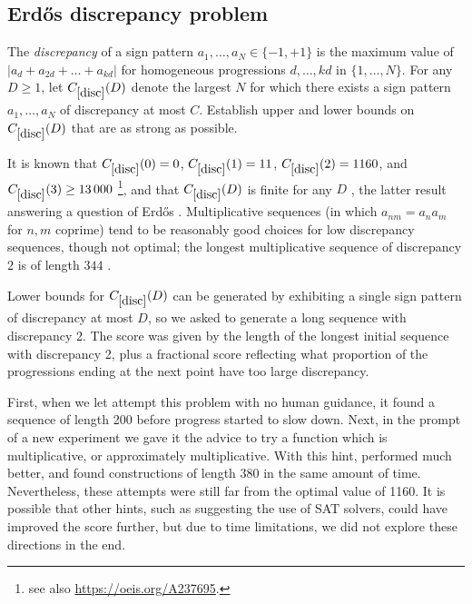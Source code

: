  

\subsection{Erd\H{o}s discrepancy problem}

\renewcommand{\problemURL}{https://google-deepmind.github.io/alphaevolve_repository_of_problems/problems/40.html}

\begin{problem}\label{disc}
The \emph{discrepancy} of a sign pattern $a_1,\dots,a_N \in \{-1,+1\}$ is the maximum value of $|a_d + a_{2d} + \dots + a_{kd}|$ for homogeneous progressions $d,\dots,kd$ in $\{1,\dots,N\}$.  For any $D \geq 1$, let $C_{\ref{disc}}(D)$ denote the largest $N$ for which there exists a sign pattern $a_1,\dots,a_N$ of discrepancy at most $C$.  Establish upper and lower bounds on $C_{\ref{disc}}(D)$ that are as strong as possible.
\end{problem}

It is known that $C_{\ref{disc}}(0)=0$, $C_{\ref{disc}}(1)=11$, $C_{\ref{disc}}(2)=1160$, and $C_{\ref{disc}}(3) \geq \num{13000}$ \cite{konev-lisitsa}\footnote{see also \href{OEIS A237695}{https://oeis.org/A237695}.}, and that $C_{\ref{disc}}(D)$ is finite for any $D$ \cite{tao-erdos}, the latter result answering a question of Erd\H{o}s \cite{erdos-disc}.   Multiplicative sequences (in which $a_{nm} = a_n a_m$ for $n,m$ coprime) tend to be reasonably good choices for low discrepancy sequences, though not optimal; the longest multiplicative sequence of discrepancy $2$ is of length $344$ \cite{konev-lisitsa}.

Lower bounds for $C_{\ref{disc}}(D)$ can be generated by exhibiting a single sign pattern of discrepancy at most $D$, so we asked \AlphaEvolve to generate a long sequence with discrepancy 2. The score was given by the length of the longest initial sequence with discrepancy 2, plus a fractional score reflecting what proportion of the progressions ending at the next point have too large discrepancy. 

First, when we let \AlphaEvolve attempt this problem with no human guidance, it found a sequence of length 200 before progress started to slow down. Next, in the prompt of a new experiment we gave it the advice to try a function which is multiplicative, or approximately multiplicative. With this hint, \AlphaEvolve performed much better, and found constructions of length 380 in the same amount of time. Nevertheless, these attempts were still far from the optimal value of 1160. It is possible that other hints, such as suggesting the use of SAT solvers, could have improved the score further, but due to time limitations, we did not explore these directions in the end.


